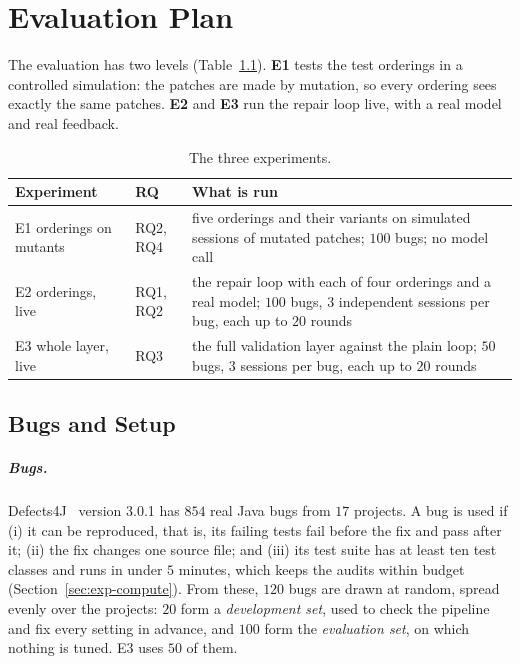 \chapter{Evaluation Plan}
\label{ch:experiments}

The evaluation has two levels (Table~\ref{tab:exp-overview}). \textbf{E1} tests
the test orderings in a controlled simulation: the patches are made by
mutation, so every ordering sees exactly the same patches. \textbf{E2} and
\textbf{E3} run the repair loop live, with a real model and real feedback.

\begin{table}[htbp]
\centering
\caption{The three experiments.}
\label{tab:exp-overview}
\footnotesize
\begin{tabularx}{\textwidth}{@{}>{\raggedright\arraybackslash}p{} >{\raggedright\arraybackslash}p{} >{\raggedright\arraybackslash}X@{}}
\toprule
Experiment & RQ & What is run\\
\midrule
E1 orderings on mutants & RQ2, RQ4 & five orderings and their variants on simulated sessions of mutated patches; $100$ bugs; no model call\\
E2 orderings, live & RQ1, RQ2 & the repair loop with each of four orderings and a real model; $100$ bugs, $3$ independent sessions per bug, each up to $20$ rounds\\
E3 whole layer, live & RQ3 & the full validation layer against the plain loop; $50$ bugs, $3$ sessions per bug, each up to $20$ rounds\\
\bottomrule
\end{tabularx}
\end{table}

\section{Bugs and Setup}
\label{sec:exp-selection}

\paragraph{Bugs.} Defects4J~\citep{just2014defects4j} version 3.0.1 has $854$
real Java bugs from $17$ projects. A bug is used if (i) it can be reproduced, that is, its failing tests fail
before the fix and pass after it; (ii) the fix changes one
source file; and (iii) its test suite has at least ten test classes and runs in
under $5$ minutes, which keeps the audits within budget
(Section~\ref{sec:exp-compute}). From these, $120$ bugs are drawn at random, spread evenly
over the projects: $20$ form a \emph{development set}, used to check the
pipeline and fix every setting in advance, and $100$ form the
\emph{evaluation set}, on which nothing is tuned. E3 uses $50$ of them.

